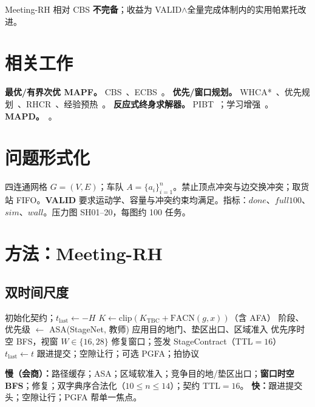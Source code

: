\documentclass[11pt,a4paper]{ctexart}
\begin{document}
Meeting-RH 相对 CBS \textbf{不完备}；收益为 VALID$\land$全量完成体制内的实用帕累托改进。

\section{相关工作}
\textbf{最优/有界次优 MAPF。} CBS~\citep{sharon2015cbs}、ECBS~\citep{barer2014ecbs,pearl1982focal}。
\textbf{优先/窗口规划。} WHCA*~\citep{silver2005whca}、优先规划~\citep{cap2015prioritized}、RHCR~\citep{li2021rhcr}、经验预热~\citep{madar2022exrhcr}。
\textbf{反应式终身求解器。} PIBT~\citep{okumura2022pibt}；学习增强~\citep{skrynnik2024follow,damani2021primal}。
\textbf{MAPD。}~\citep{ma2017mapd2,liu2019lifelong}。

\section{问题形式化}
四连通网格 $G=(V,E)$；车队 $A=\{a_i\}_{i=1}^{n}$。禁止顶点冲突与边交换冲突；取货站 FIFO。\textbf{VALID} 要求运动学、容量与冲突约束均满足。指标：$\textit{done}$、$\textit{full100}$、$\textit{sim}$、$\textit{wall}$。压力图 SH01--20，每图约 100 任务。

\section{方法：Meeting-RH}
\subsection{双时间尺度}
\begin{algorithm}[t]
\caption{Meeting-RH 拍循环（概念）}
\label{alg:meet}
\begin{algorithmic}[1]
\State 初始化契约；$t_{\mathrm{last}}\leftarrow -H$
    \State $K\leftarrow\mathrm{clip}(K_{\mathrm{TBC}}+\mathrm{FACN}(g,x))$（含 AFA）
    \State 阶段、优先级 $\leftarrow$ ASA(StageNet, 教师)
    \State 应用目的地门、垫区出口、区域准入
    \State 优先序时空 BFS，视窗 $W\in\{16,28\}$
    \State 修复窗口；签发 StageContract（TTL${=}16$）
    \State $t_{\mathrm{last}}\leftarrow t$
  \EndIf
  \State 跟进提交；空隙让行；可选 PGFA；拍协议
\EndFor
\end{algorithmic}
\end{algorithm}

\textbf{慢（会商）：}路径缓存；ASA；区域软准入；竞争目的地/垫区出口；\textbf{窗口时空 BFS}；修复；双字典序合法化（$10\le n\le 14$）；契约 TTL${=}16$。
\textbf{快：}跟进提交头；空隙让行；PGFA 帮单一焦点。
\end{document}
